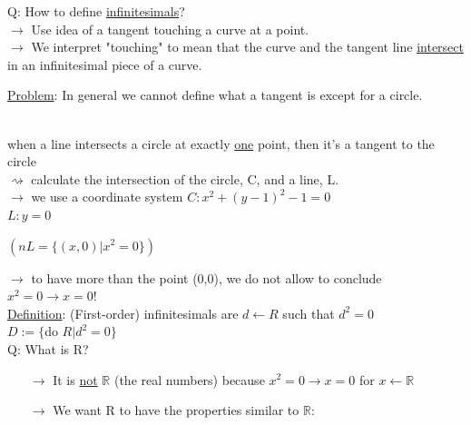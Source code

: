 \documentclass[a4paper, 12pt]{article}
\begin{document}
\begin{enumerate}
Q: How to define \underline{infinitesimals}?\\
$\rightarrow$ Use idea of a tangent touching a curve at a point.\\
$\rightarrow$ We interpret "touching" to mean that the curve and the tangent line \underline{intersect} in an infinitesimal piece of a curve.\\
\begin{center}
\end{center}
\underline{Problem}: In general we cannot define what a tangent is except for a circle.
\begin{centering}
\begin{multicols}{2}
\\
when a line intersects a circle at exactly \underline{one} point, then it's a tangent to the circle\\
$\rightsquigarrow$ calculate the intersection of the circle, C, and a line, L.\\
$\rightarrow$ we use a coordinate system
$C: x^2 + (y-1)^2 - 1 = 0$\\
$L: y=0 $
\end{multicols}
$(nL = \{(x,0) | x^2 = 0\})$\\
\end{centering}
$\rightarrow$ to have more than the point (0,0), we do not allow to conclude $x^2=0 \rightarrow x=0!$\\
\underline{Definition}: (First-order) infinitesimals are $d \leftarrow R$ such that $d^2=0$\\
$D:=\{$do $ R|d^2=0\}$\\
Q: What is R?
\begin{itemize}
\item[$\rightarrow$] It is \underline{not} $\mathbb{R}$ (the real numbers) because $x^2=0 \rightarrow x=0$ for $x \leftarrow \mathbb{R}$
\item[$\rightarrow$] We want R to have the properties similar to $\mathbb{R}$:

\end{itemize}
\end{enumerate}
\end{document}
